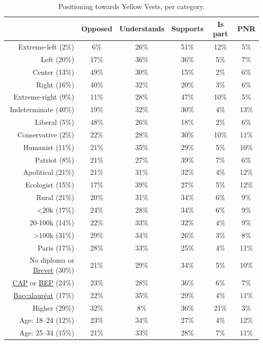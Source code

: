 \documentclass[english,5p,authoryear]{elsarticle}
\begin{document}
\begin{appendices}
\begin{spacing}{1.8}
\begin{table}[ht]
\centering
\caption{Positioning towards Yellow Vests, per category.}
{\fontsize{10}{16}\selectfont
\begin{tabular}{rccccc}
  \hline \hline
 & Opposed & Understands & Supports & Is part & PNR \\ 
  \hline
  Extreme-left (2\%) & 6\% & 26\% & 51\% & 12\% & 5\% \\ 
  Left (20\%) & 17\% & 36\% & 36\% & 5\% & 7\% \\ 
  Center (13\%) & 49\% & 30\% & 15\% & 2\% & 6\% \\ 
  Right (16\%) & 40\% & 32\% & 20\% & 3\% & 6\% \\ 
  Extreme-right (9\%) & 11\% & 28\% & 47\% & 10\% & 5\% \\
  Indeterminate (40\%) & 19\% & 32\% & 30\% & 4\% & 13\% \\
  \hline
  Liberal (5\%) & 48\% & 26\% & 18\% & 2\% & 6\% \\
  Conservative (2\%) & 22\% & 28\% & 30\% & 10\% & 11\% \\
  Humanist (11\%) & 21\% & 35\% & 29\% & 5\% & 10\% \\
  Patriot (8\%) & 21\% & 27\% & 39\% & 7\% & 6\% \\
  Apolitical (21\%) & 21\% & 31\% & 32\% & 4\% & 12\% \\
  Ecologist (15\%) & 17\% & 39\% & 27\% & 5\% & 12\% \\
  \hline
  Rural (21\%) & 20\% & 31\% & 34\% & 6\% & 9\% \\ 
  <20k (17\%) & 24\% & 28\% & 34\% & 6\% & 9\% \\ 
  20-100k (14\%) & 22\% & 33\% & 32\% & 4\% & 9\% \\ 
  >100k (31\%) & 29\% & 34\% & 26\% & 3\% & 8\% \\ 
  Paris (17\%) & 28\% & 33\% & 25\% & 4\% & 11\% \\
  \hline
  No diploma or \uline{Brevet} (30\%) & 21\% & 29\% & 34\% & 5\% & 10\% \\ 
  \uline{CAP} or \uline{BEP} (24\%) & 23\% & 28\% & 36\% & 6\% & 7\% \\ 
  \uline{Baccalauréat} (17\%) & 22\% & 35\% & 29\% & 4\% & 11\% \\ 
  Higher (29\%) & 32\% & 8\% & 36\% & 21\% & 3\% \\
  \hline
  Age: 18--24 (12\%) & 23\% & 34\% & 27\% & 4\% & 12\% \\ 
  Age: 25--34 (15\%) & 21\% & 33\% & 28\% & 7\% & 11\% \\ 

\end{tabular}}
\end{table}
\end{spacing}
\end{appendices}
\end{document}
